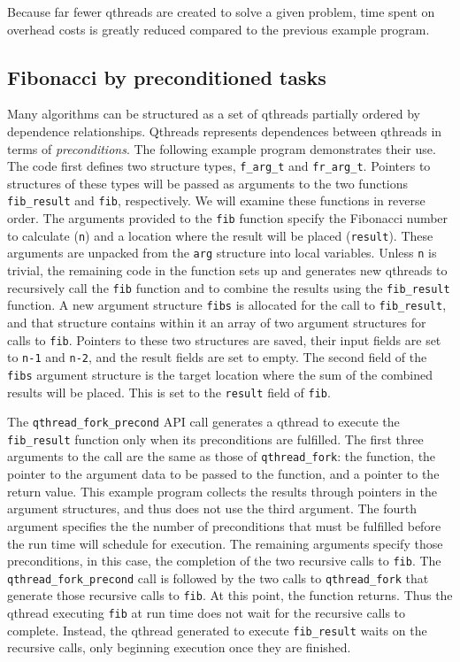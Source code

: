 \documentclass[12pt]{article}
\begin{document}
Because far fewer qthreads are created to solve a given problem, time spent on overhead costs is greatly reduced compared to the previous example program.

\subsection{Fibonacci by preconditioned tasks}

Many algorithms can be structured as a set of qthreads partially ordered by dependence relationships.  Qthreads represents dependences between qthreads in terms of {\it preconditions}.  The following example program demonstrates their use.
\\


The code first defines two structure types, {\tt f\_arg\_t} and {\tt fr\_arg\_t}.  Pointers to structures of these types will be passed as arguments to the two functions {\tt fib\_result} and {\tt fib}, respectively.  We will examine these functions in reverse order.  The arguments provided to the {\tt fib} function specify the Fibonacci number to calculate ({\tt n}) and a location where the result will be placed ({\tt result}).   These arguments are unpacked from the {\tt arg} structure into local variables.  Unless {\tt n} is trivial, the remaining code in the function sets up and generates new qthreads to recursively call the {\tt fib} function and to combine the results using the {\tt fib\_result} function.  A new argument structure {\tt fibs} is allocated for the call to {\tt fib\_result}, and that structure contains within it an array of two argument structures for calls to {\tt fib}.  Pointers to these two structures are saved, their input fields are set to {\tt n-1} and {\tt n-2}, and the result fields are set to empty.  The second field of the {\tt fibs} argument structure is the target location where the sum of the combined results will be placed.  This is set to the {\tt result} field of {\tt fib}.

The {\tt qthread\_fork\_precond} API call generates a qthread to execute the {\tt fib\_result} function only when its preconditions are fulfilled.  The first three arguments to the call are the same as those of {\tt qthread\_fork}: the function, the pointer to the argument data to be passed to the function, and a pointer to the return value.  This example program collects the results through pointers in the argument structures, and thus does not use the third argument.  The fourth argument specifies the the number of preconditions that must be fulfilled before the run time will schedule for execution.  The remaining arguments specify those preconditions, in this case, the completion of the two recursive calls to {\tt fib}.  The {\tt qthread\_fork\_precond} call is followed by the two calls to {\tt qthread\_fork} that generate those recursive calls to {\tt fib}.  At this point, the function returns.  Thus the qthread executing {\tt fib} at run time does not wait for the recursive calls to complete.  Instead, the qthread generated to execute {\tt fib\_result} waits on the recursive calls, only beginning execution once they are finished.
\end{document}
